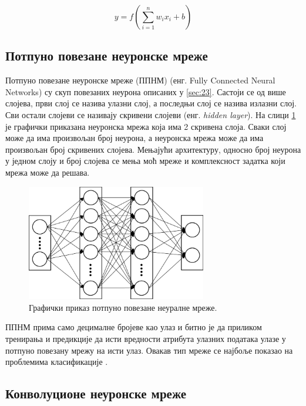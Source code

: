 \documentclass[a4paper, 12pt, master, utf8]{etf}
\begin{document}
\begin{equation}
    y = f\left(\sum_{i=1}^{n} w_i x_i + b\right)
    \label{eq:neuron}
\end{equation}
\subsection{Потпуно повезане неуронске мреже}
\label{sec:232}

Потпуно повезане неуронске мреже (ППНМ) (енг. Fully Connected Neural Networks) су скуп повезаних неурона описаних у \ref{sec:23}. Састоји се од више слојева, први слој се назива улазни слој,
а последњи слој се назива излазни слој. Сви остали слојеви се називају скривени слојеви (енг. \textit{hidden layer}). На слици \ref{fig:fc} је графички приказана неуронска мрежа која има 2 скривена слоја.
Сваки слој може да има произвољан број неурона, а неуронска мрежа може да има произвољан број скривених слојева. Мењајући архитектуру, односно број неурона у једном слоју и број слојева
се мења моћ мреже и комплексност задатка који мрежа може да решава.


\begin{figure}[h]
    \centering
    \includegraphics[width=0.7\textwidth]{images/fc.png}
    \caption{Графички приказ потпуно повезане неуралне мреже. \cite{anwar_learned_2017}}
    \label{fig:fc}
\end{figure}


ППНМ прима само децималне бројеве као улаз и битно је да приликом тренирања и предикције да исти вредности атрибута улазних података улазе у потпуно повезану мрежу на исти улаз.
Овакав тип мреже се најбоље показао на проблемима класификације \cite{noauthor_artificial_2023}.

\subsection{Конволуционе неуронске мреже}
\label{sec:232}
\end{document}
